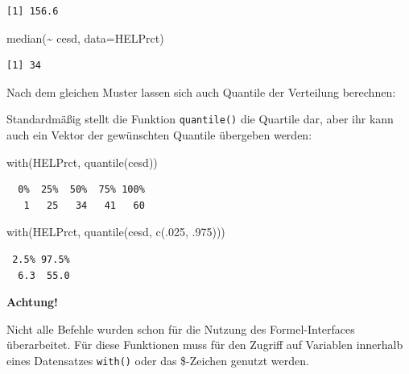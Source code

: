 \documentclass[
  ngerman,
]{scrbook}
\newenvironment{Shaded}{\begin{snugshade}}{\end{snugshade}}
\newcommand{\AttributeTok}[1]{\textcolor[rgb]{0.77,0.63,0.00}{#1}}
\newcommand{\DecValTok}[1]{\textcolor[rgb]{0.00,0.00,0.81}{#1}}
\newcommand{\FunctionTok}[1]{\textcolor[rgb]{0.00,0.00,0.00}{#1}}
\newcommand{\NormalTok}[1]{#1}
\newcommand{\SpecialCharTok}[1]{\textcolor[rgb]{0.00,0.00,0.00}{#1}}
\newenvironment{achtung}[1]
  {
  \begin{itemize}
  \renewcommand{\labelitemi}{
    \raisebox{1.8\height}[0pt][0pt]{
      {\setkeys{Gin}{width=7em,keepaspectratio}
        {\Large \textcolor{dark-fom-green}\faExclamationCircle}}
        }
  }
  \begin{blackbox}
        \bgroup\color{dark-fom-green}
          {\textbf{Achtung!}}
        \egroup
  \item
  }
  {
  \end{blackbox}
  \end{itemize}
  }
\begin{document}
\begin{verbatim}
[1] 156.6
\end{verbatim}

\begin{Shaded}
\begin{Highlighting}[]
\FunctionTok{median}\NormalTok{(}\SpecialCharTok{\textasciitilde{}}\NormalTok{ cesd, }\AttributeTok{data=}\NormalTok{HELPrct)}
\end{Highlighting}
\end{Shaded}

\begin{verbatim}
[1] 34
\end{verbatim}

Nach dem gleichen Muster lassen sich auch Quantile der Verteilung berechnen:

Standardmäßig stellt die Funktion \texttt{quantile()} die Quartile dar, aber ihr kann auch ein Vektor der gewünschten Quantile übergeben werden:

\begin{Shaded}
\begin{Highlighting}[]
\FunctionTok{with}\NormalTok{(HELPrct, }\FunctionTok{quantile}\NormalTok{(cesd))}
\end{Highlighting}
\end{Shaded}

\begin{verbatim}
  0%  25%  50%  75% 100% 
   1   25   34   41   60 
\end{verbatim}

\begin{Shaded}
\begin{Highlighting}[]
\FunctionTok{with}\NormalTok{(HELPrct, }\FunctionTok{quantile}\NormalTok{(cesd, }\FunctionTok{c}\NormalTok{(.}\DecValTok{025}\NormalTok{, .}\DecValTok{975}\NormalTok{)))}
\end{Highlighting}
\end{Shaded}

\begin{verbatim}
 2.5% 97.5% 
  6.3  55.0 
\end{verbatim}

\begin{achtung}{achtung}
Nicht alle Befehle wurden schon für die Nutzung des Formel-Interfaces überarbeitet. Für diese Funktionen muss für den Zugriff auf Variablen innerhalb eines Datensatzes \texttt{with()} oder das \$-Zeichen genutzt werden.

\end{achtung}
\end{document}
